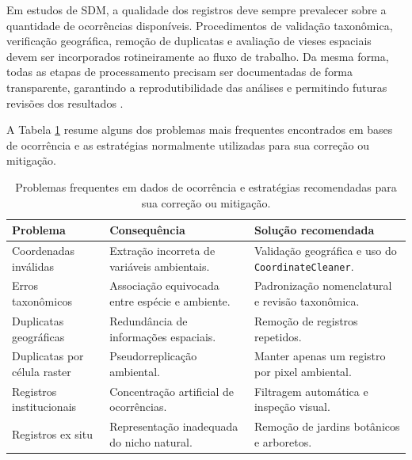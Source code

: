 Em estudos de SDM, a qualidade dos registros deve sempre prevalecer sobre a quantidade de ocorrências disponíveis. Procedimentos de validação taxonômica, verificação geográfica, remoção de duplicatas e avaliação de vieses espaciais devem ser incorporados rotineiramente ao fluxo de trabalho. Da mesma forma, todas as etapas de processamento precisam ser documentadas de forma transparente, garantindo a reprodutibilidade das análises e permitindo futuras revisões dos resultados \parencite{zurell2020standard,guisan2017habitat}.

A Tabela \ref{tab:boas_praticas_ocorrencias} resume alguns dos problemas mais frequentes encontrados em bases de ocorrência e as estratégias normalmente utilizadas para sua correção ou mitigação.


\begin{table}[H]
	\centering
	\caption{Problemas frequentes em dados de ocorrência e estratégias recomendadas para sua correção ou mitigação.}
	\label{tab:boas_praticas_ocorrencias}
	\begin{tabular}{p{4cm}p{5cm}p{5cm}}
		\toprule
		\textbf{Problema} &
		\textbf{Consequência} &
		\textbf{Solução recomendada} \\
		\midrule
		
		Coordenadas inválidas
		&
		Extração incorreta de variáveis ambientais.
		&
		Validação geográfica e uso do \texttt{CoordinateCleaner}.
		
		\\
		
		Erros taxonômicos
		&
		Associação equivocada entre espécie e ambiente.
		&
		Padronização nomenclatural e revisão taxonômica.
		
		\\
		
		Duplicatas geográficas
		&
		Redundância de informações espaciais.
		&
		Remoção de registros repetidos.
		
		\\
		
		Duplicatas por célula raster
		&
		Pseudorreplicação ambiental.
		&
		Manter apenas um registro por pixel ambiental.
		
		\\
		
		Registros institucionais
		&
		Concentração artificial de ocorrências.
		&
		Filtragem automática e inspeção visual.
		
		\\
		
		Registros ex situ
		&
		Representação inadequada do nicho natural.
		&
		Remoção de jardins botânicos e arboretos.
		

\end{tabular}
\end{table}
